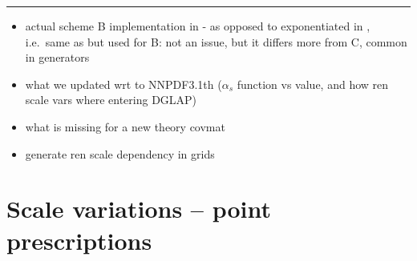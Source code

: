\vspace*{20pt}
\noindent
\rule{\hsize}{1pt}

\begin{itemize}
	\item actual scheme B implementation in \eko - as opposed to exponentiated
		in \apfel, i.e.\ same as \pegasus but used for B: not an issue, but it
		differs more from C, common in \mc generators
	\item what we updated wrt to NNPDF3.1th ($\alpha_s$ function vs value, and
		how ren scale vars where entering DGLAP)
	\item what is missing for a new theory covmat
	\item generate ren scale dependency in grids
\end{itemize}

\section{Scale variations -- point prescriptions}
\label{sec:mhou/prescriptions}

